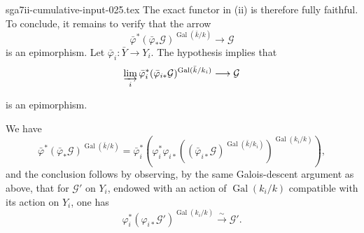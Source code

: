 \begin{filecontents*}{sga7ii-cumulative-input-025.tex}
The exact functor in (ii) is therefore fully faithful.  To conclude, it
remains to verify that the arrow
\begin{equation*}
\bar\varphi^*(\bar\varphi_*\mathcal G)^{
  \operatorname{Gal}(\bar k/k)}\longrightarrow\mathcal G
\end{equation*}
is an epimorphism.  Let $\bar\varphi_i:\bar Y\longrightarrow Y_i$.
The hypothesis implies that
\begin{equation*}
\varinjlim_i
\bar\varphi_i^*(\bar\varphi_{i*}\mathcal G)^{
  \operatorname{Gal}(\bar k/k_i)}
\longrightarrow\mathcal G
\end{equation*}

is an epimorphism.

We have
\begin{equation*}
\bar\varphi^*(\bar\varphi_*\mathcal G)^{
  \operatorname{Gal}(\bar k/k)}
=
\bar\varphi_i^*\!\left(
  \varphi_i^*\varphi_{i*}
  \left((\bar\varphi_{i*}\mathcal G)^{
    \operatorname{Gal}(\bar k/k_i)}\right)^{
    \operatorname{Gal}(k_i/k)}
\right),
\end{equation*}
and the conclusion follows by observing, by the same Galois-descent
argument as above, that for $\mathcal G'$ on $Y_i$, endowed with an
action of $\operatorname{Gal}(k_i/k)$ compatible with its action on
$Y_i$, one has
\begin{equation*}
\varphi_i^*(\varphi_{i*}\mathcal G')^{
  \operatorname{Gal}(k_i/k)}
\xrightarrow{\sim}\mathcal G'.
\end{equation*}
\end{filecontents*}
